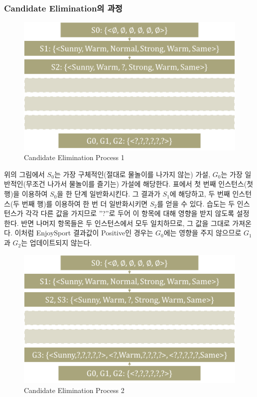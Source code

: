 \documentclass[a4paper]{oblivoir}
\begin{document}
\subsubsection{Candidate Elimination의 과정}
\begin{figure}[ht]
\centering
\includegraphics[scale=0.5]{Candidate_Elimination1.png}
\caption{Candidate Elimination Process 1}
\label{Figure 2-7}
\end{figure}
\indent 위의 그림에서 $S_{0}$는 가장 구체적인(절대로 물놀이를 나가지 않는) 가설, $G_{0}$는 가장 일반적인(무조건 나가서 물놀이를 즐기는) 가설에 해당한다. 표에서 첫 번째 인스턴스(첫 행)을 이용하여 $S_{0}$을 한 단계 일반화시킨다. 그 결과가 $S_{1}$에 해당하고, 두 번째 인스턴스(두 번째 행)를 이용하여 한 번 더 일반화시키면 $S_{2}$를 얻을 수 있다. 습도는 두 인스턴스가 각각 다른 값을 가지므로 ''?''로 두어 이 항목에 대해 영향을 받지 않도록 설정한다. 반면 나머지 항목들은 두 인스턴스에서 모두 일치하므로, 그 값을 그대로 가져온다. 이처럼 EnjoySport 결과값이 Positive인 경우는 $G_{0}$에는 영향을 주지 않으므로 $G_{1}$과 $G_{2}$는 업데이트되지 않는다. \\
\begin{figure}[ht]
\centering
\includegraphics[scale=0.5]{Candidate_Elimination2.png}
\caption{Candidate Elimination Process 2}
\label{Figure 2-8}
\end{figure}
\end{document}
